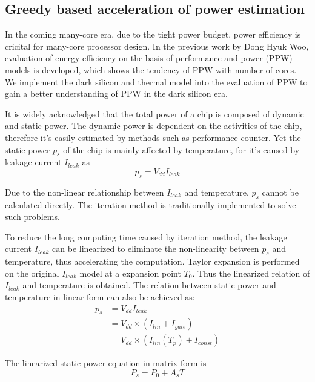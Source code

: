 \subsection{Greedy based acceleration of power estimation}






In the coming many-core era, due to the tight power budget, power efficiency is cricital for
many-core processor design. In the previous work by Dong Hyuk Woo, evaluation of energy
efficiency on the basis of performance and power (PPW) models is developed, which shows the
tendency of PPW with number of cores. We implement the dark silicon and thermal model into the
evaluation of PPW to gain a better understanding of PPW in the dark silicon era.

It is widely acknowledged that the total power of a chip is composed of dynamic and 
static power. The dynamic power is dependent on the activities of the chip, therefore it's 
easily estimated by methods such as performance counter.
Yet the static power $p_{s}$ of the chip is mainly affected by temperature, for it's caused by
leakage current $I_{leak}$ as
\begin{equation}\label{ps}
p_{s} = V_{dd}I_{leak}
\end{equation}

Due to the non-linear relationship between $I_{leak}$ and temperature, $p_{s}$ cannot be
calculated directly. The iteration method is traditionally implemented to solve such problems.

To reduce the long computing time caused by iteration method, the leakage current $I_{leak}$ 
can be linearized to eliminate the non-linearity between $p_{s}$ and temperature, thus 
accelerating the computation.
Taylor expansion is performed on the original $I_{leak}$ model at a expansion point $T_{0}$. 
Thus the linearized relation of $I_{leak}$ and temperature is obtained. The relation between 
static power and temperature in linear form can also be achieved as:
\begin{equation}\label{linear_static}
\begin{split}
p_{s} &= V_{dd}I_{leak}\\
&= V_{dd} \times (I_{lin}+I_{gate})\\
&= V_{dd} \times (I_{lin}(T_{p})+I_{const})
\end{split}
\end{equation}

The linearized static power equation in matrix form is
\begin{equation}\label{linear_static_matrix}
P_{s} = P_{0}+A_{s}T
\end{equation}

